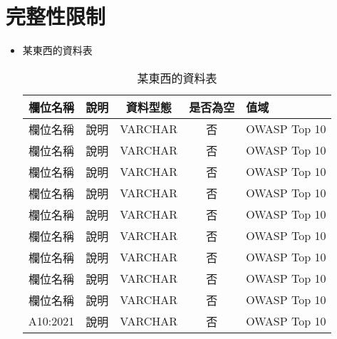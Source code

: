 \chapter{完整性限制}

\begin{itemize}
    \item 某東西的資料表
        \begin{table}[h!]
            \captionsetup{justification=centering}
            \caption{某東西的資料表}
            \centering
            \renewcommand{\arraystretch}{1.2}
            \begin{tabular}{|c|l|c|c|l|}
                \hline
                \textbf{欄位名稱} & \textbf{說明} & \textbf{資料型態} & \textbf{是否為空} & \textbf{值域} \\
                \hline
                欄位名稱 & 說明 & VARCHAR & 否 & OWASP Top 10 \\
                \hline
                欄位名稱 & 說明 & VARCHAR & 否 & OWASP Top 10 \\
                \hline
                欄位名稱 & 說明 & VARCHAR & 否 & OWASP Top 10 \\
                \hline
                欄位名稱 & 說明 & VARCHAR & 否 & OWASP Top 10 \\
                \hline
                欄位名稱 & 說明 & VARCHAR & 否 & OWASP Top 10 \\
                \hline
                欄位名稱 & 說明 & VARCHAR & 否 & OWASP Top 10 \\
                \hline
                欄位名稱 & 說明 & VARCHAR & 否 & OWASP Top 10 \\
                \hline
                欄位名稱 & 說明 & VARCHAR & 否 & OWASP Top 10 \\
                \hline
                欄位名稱 & 說明 & VARCHAR & 否 & OWASP Top 10 \\
                \hline
                A10:2021 & 說明 & VARCHAR & 否 & OWASP Top 10 \\
                \hline
            \end{tabular}
        \end{table}
\end{itemize}
